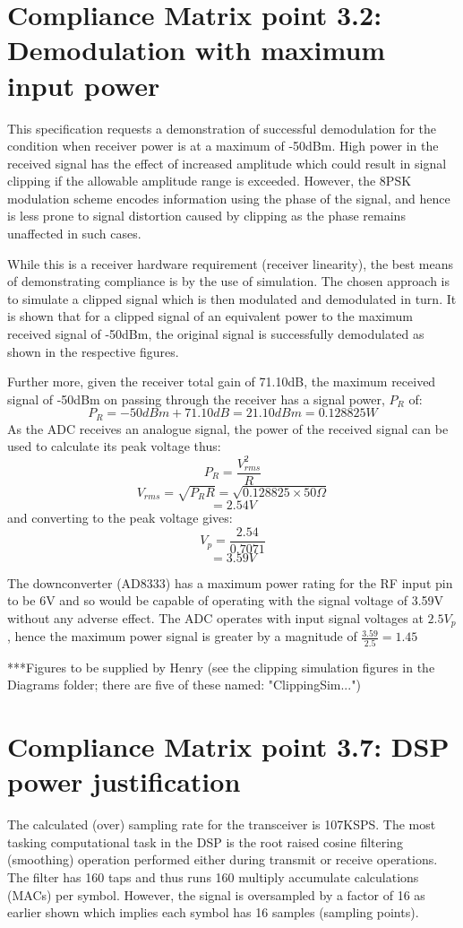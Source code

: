 \section{Compliance Matrix point 3.2: Demodulation with maximum input power}
This specification requests a demonstration of successful demodulation for the condition when receiver power is at a maximum of -50dBm.  High power in the received signal has the effect of increased amplitude which could result in signal clipping if the allowable amplitude range is exceeded.  However, the 8PSK modulation scheme encodes information using the phase of the signal, and hence is less prone to signal distortion caused by clipping as the phase remains unaffected in such cases.

While this is a receiver hardware requirement (receiver linearity), the best means of demonstrating compliance is by the use of simulation.  The chosen approach is to simulate a clipped signal which is then modulated and demodulated in turn.  It is shown that for a clipped signal of an equivalent power to the maximum received signal of -50dBm, the original signal is successfully demodulated as shown in the respective figures.

Further more, given the receiver total gain of 71.10dB, the maximum received signal of -50dBm on passing through the receiver has a signal power, \(P_{R}\) of:
	\[ P_{R}  = -50dBm + 71.10dB = 21.10dBm = 0.128825 W 		\]
As the ADC receives an analogue signal, the power of the received signal can be used to calculate its peak voltage thus:
	\[  P_{R} = \frac{V_{rms}^2}{R} \]
	\[	V_{rms} = \sqrt{P_{R} R} = \sqrt{0.128825 \times 50\Omega} \]
	\[			= 2.54V  \]
and converting to the peak voltage gives:
	\[	V_{p}	= \frac{2.54}{0.7071}   \]
	\[			= 3.59V \]
	
The downconverter (AD8333) has a maximum power rating for the RF input pin to be 6V and so would be capable of operating with the signal voltage of 3.59V without any adverse effect. The ADC operates with input signal voltages at \(2.5V_{p}\), hence the maximum power signal is greater by a magnitude of \( \frac{3.59}{2.5} = 1.45 \) 

***Figures to be supplied by Henry (see the clipping simulation figures in the Diagrams folder; there are five of these named: "ClippingSim...")


\section{Compliance Matrix point 3.7: DSP power justification}
The calculated (over) sampling rate for the transceiver is 107KSPS. The most tasking computational task in the DSP is the root raised cosine filtering (smoothing) operation performed either during transmit or receive operations.  The filter has 160 taps and thus runs 160 multiply accumulate calculations (MACs) per symbol.  However, the signal is oversampled by a factor of 16 as earlier shown which implies each symbol has 16 samples (sampling points).


